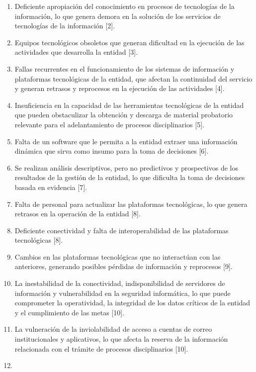 \documentclass[
	a4paper, %
	12pt, %
]{include/CSSullivanBusinessReport}
\def\tightlist{}
\begin{document}
\begin{enumerate}
\def\labelenumi{\arabic{enumi}.}
\tightlist
\item
  Deficiente apropiación del conocimiento en procesos de tecnologías de
  la información, lo que genera demora en la solución de los servicios
  de tecnologías de la información {[}2{]}.
\item
  Equipos tecnológicos obsoletos que generan dificultad en la ejecución
  de las actividades que desarrolla la entidad {[}3{]}.
\item
  Fallas recurrentes en el funcionamiento de los sistemas de información
  y plataformas tecnológicas de la entidad, que afectan la continuidad
  del servicio y generan retrasos y reprocesos en la ejecución de las
  actividades {[}4{]}.
\item
  Insuficiencia en la capacidad de las herramientas tecnológicas de la
  entidad que pueden obstaculizar la obtención y descarga de material
  probatorio relevante para el adelantamiento de procesos disciplinarios
  {[}5{]}.
\item
  Falta de un software que le permita a la entidad extraer una
  información dinámica que sirva como insumo para la toma de decisiones
  {[}6{]}.
\item
  Se realizan análisis descriptivos, pero no predictivos y prospectivos
  de los resultados de la gestión de la entidad, lo que dificulta la
  toma de decisiones basada en evidencia {[}7{]}.
\item
  Falta de personal para actualizar las plataformas tecnológicas, lo que
  genera retrasos en la operación de la entidad {[}8{]}.
\item
  Deficiente conectividad y falta de interoperabilidad de las
  plataformas tecnológicas {[}8{]}.
\item
  Cambios en las plataformas tecnológicas que no interactúan con las
  anteriores, generando posibles pérdidas de información y reprocesos
  {[}9{]}.
\item
  La inestabilidad de la conectividad, indisponibilidad de servidores de
  información y vulnerabilidad en la seguridad informática, lo que puede
  comprometer la operatividad, la integridad de los datos críticos de la
  entidad y el cumplimiento de las metas {[}10{]}.
\item
  La vulneración de la inviolabilidad de acceso a cuentas de correo
  institucionales y aplicativos, lo que afecta la reserva de la
  información relacionada con el trámite de procesos disciplinarios
  {[}10{]}.
\item

\end{enumerate}
\end{document}
